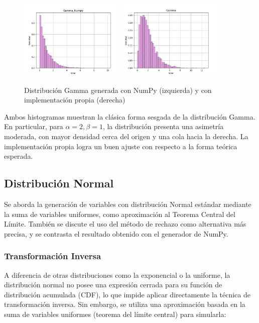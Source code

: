 \documentclass{article}
\begin{document}
\begin{figure}[H]
    \centering
    \includegraphics[width=0.45\textwidth]{Imagenes/Distribucion_Gamma_Numpy.png}
    \includegraphics[width=0.45\textwidth]{Imagenes/Distribucion_Gamma.png}
    \caption{Distribución Gamma generada con NumPy (izquierda) y con implementación propia (derecha)}
    \label{fig:gamma}
\end{figure}

Ambos histogramas muestran la clásica forma sesgada de la distribución Gamma. En particular, para \( \alpha = 2, \beta = 1 \), la distribución presenta una asimetría moderada, con mayor densidad cerca del origen y una cola hacia la derecha. La implementación propia logra un buen ajuste con respecto a la forma teórica esperada.


\subsection{Distribución Normal}
Se aborda la generación de variables con distribución Normal estándar mediante la suma de variables uniformes, como aproximación al Teorema Central del Límite. También se discute el uso del método de rechazo como alternativa más precisa, y se contrasta el resultado obtenido con el generador de NumPy.

\subsubsection*{Transformación Inversa}
A diferencia de otras distribuciones como la exponencial o la uniforme, la distribución normal no posee una expresión cerrada para su función de distribución acumulada (CDF), lo que impide aplicar directamente la técnica de transformación inversa. Sin embargo, se utiliza una aproximación basada en la suma de variables uniformes (teorema del límite central) para simularla:
\end{document}
